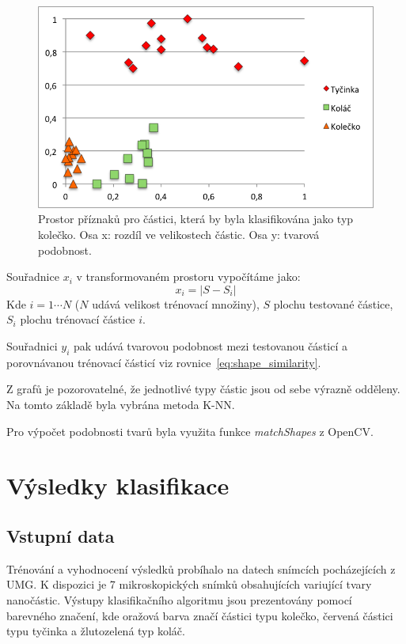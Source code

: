 \documentclass[11pt,twoside,a4paper,table]{book}
\begin{document}
\begin{figure}[H]
	\centering
	\includegraphics[height=0.3\textheight]{figures/feature_space_kolecko.png}
	\caption[Prostor příznaků pro částici, která by byla klasifikována jako typ kolečko.]{Prostor příznaků pro částici, která by byla klasifikována jako typ kolečko. Osa x: rozdíl ve velikostech částic. Osa y: tvarová podobnost.}
	\label{fig:feature_space_kolecko}
\end{figure}


Souřadnice $x_i$ v transformovaném prostoru vypočítáme jako:
\begin{equation}
x_i = \vert S - S_i \vert
\end{equation}
Kde $i=1 \cdots N$ ($N$ udává velikost trénovací množiny), $S$ plochu testované částice, $S_i$ plochu trénovací částice $i$.

Souřadnici $y_i$ pak udává tvarovou podobnost mezi testovanou částicí a porovnávanou trénovací částicí viz rovnice~\ref{eq:shape_similarity}.

Z grafů je pozorovatelné, že jednotlivé typy částic jsou od sebe výrazně odděleny. Na tomto základě byla vybrána metoda K-NN.

Pro výpočet podobnosti tvarů byla využita funkce \textit{matchShapes} z OpenCV\cite{opencv_library}.

\FloatBarrier
\section{Výsledky klasifikace}

\subsection{Vstupní data}
Trénování a vyhodnocení výsledků probíhalo na datech snímcích pocházejících z UMG. K dispozici je 7 mikroskopických snímků obsahujících variující tvary nanočástic. Výstupy klasifikačního algoritmu jsou prezentovány pomocí barevného značení, kde oražová barva značí částici typu kolečko, červená částici typu tyčinka a žlutozelená typ koláč. 
\end{document}
